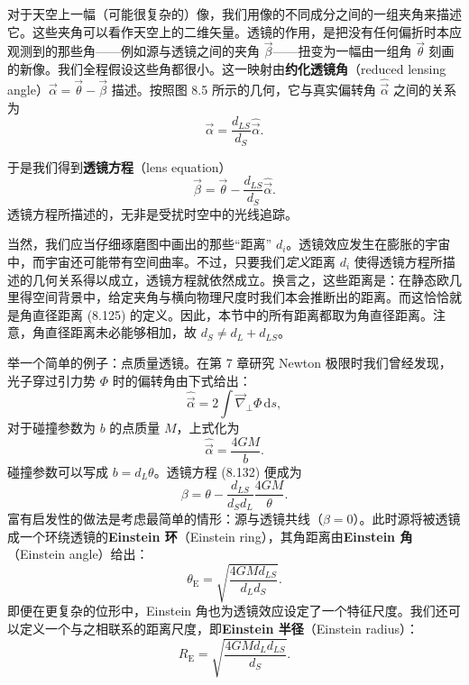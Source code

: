 对于天空上一幅（可能很复杂的）像，我们用像的不同成分之间的一组夹角来描述它。这些夹角可以看作天空上的二维矢量。透镜的作用，是把没有任何偏折时本应观测到的那些角——例如源与透镜之间的夹角 $\vec{\beta}$——扭变为一幅由一组角 $\vec{\theta}$ 刻画的新像。我们全程假设这些角都很小。这一映射由\textbf{约化透镜角}（reduced lensing angle）$\vec{\alpha}=\vec{\theta}-\vec{\beta}$ 描述。按照图 8.5 所示的几何，它与真实偏转角 $\widehat{\vec{\alpha}}$ 之间的关系为
\begin{equation*}
\vec{\alpha} = \frac{d_{LS}}{d_S}\widehat{\vec{\alpha}}.
\tag{8.131}
\end{equation*}

于是我们得到\textbf{透镜方程}（lens equation）
\begin{equation*}
\boxed{\,\vec{\beta} = \vec{\theta} - \frac{d_{LS}}{d_S}\widehat{\vec{\alpha}}.\,}
\tag{8.132}
\end{equation*}
透镜方程所描述的，无非是受扰时空中的光线追踪。

当然，我们应当仔细琢磨图中画出的那些“距离” $d_i$。透镜效应发生在膨胀的宇宙中，而宇宙还可能带有空间曲率。不过，只要我们\emph{定义}距离 $d_i$ 使得透镜方程所描述的几何关系得以成立，透镜方程就依然成立。换言之，这些距离是：在静态欧几里得空间背景中，给定夹角与横向物理尺度时我们本会推断出的距离。而这恰恰就是角直径距离 (8.125) 的定义。因此，本节中的所有距离都取为角直径距离。注意，角直径距离未必能够相加，故 $d_S\neq d_L+d_{LS}$。

举一个简单的例子：点质量透镜。在第 7 章研究 Newton 极限时我们曾经发现，光子穿过引力势 $\Phi$ 时的偏转角由下式给出：
\begin{equation*}
\widehat{\vec{\alpha}} = 2\int \vec{\nabla}_{\perp}\Phi\,\mathrm{d}s,
\tag{8.133}
\end{equation*}
对于碰撞参数为 $b$ 的点质量 $M$，上式化为
\begin{equation*}
\widehat{\vec{\alpha}} = \frac{4GM}{b}.
\tag{8.134}
\end{equation*}
碰撞参数可以写成 $b=d_L\theta$。透镜方程 (8.132) 便成为
\begin{equation*}
\beta = \theta - \frac{d_{LS}}{d_S d_L}\frac{4GM}{\theta}.
\tag{8.135}
\end{equation*}
富有启发性的做法是考虑最简单的情形：源与透镜共线（$\beta=0$）。此时源将被透镜成一个环绕透镜的\textbf{Einstein 环}（Einstein ring），其角距离由\textbf{Einstein 角}（Einstein angle）给出：
\begin{equation*}
\theta_{\mathrm{E}} = \sqrt{\frac{4GMd_{LS}}{d_L d_S}}.
\tag{8.136}
\end{equation*}
即便在更复杂的位形中，Einstein 角也为透镜效应设定了一个特征尺度。我们还可以定义一个与之相联系的距离尺度，即\textbf{Einstein 半径}（Einstein radius）：
\begin{equation*}
R_{\mathrm{E}} = \sqrt{\frac{4GMd_L d_{LS}}{d_S}}.
\tag{8.137}
\end{equation*}


